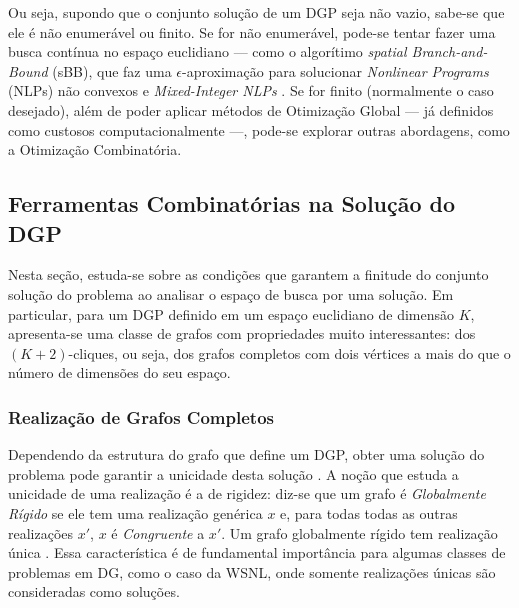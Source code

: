 Ou seja, supondo que o conjunto solução de um DGP seja não vazio, sabe-se que ele é não enumerável ou finito. Se for não enumerável, pode-se tentar fazer uma busca contínua no espaço euclidiano --- como o algorítimo \textit{spatial Branch-and-Bound} (sBB), que faz uma $\epsilon$-aproximação para solucionar \textit{Nonlinear Programs} (NLPs) não convexos e \textit{Mixed-Integer NLPs} \cite{carlileGDandAplications}. Se for finito (normalmente o caso desejado), além de poder aplicar métodos de Otimização Global --- já definidos como custosos computacionalmente ---, pode-se explorar outras abordagens, como a Otimização Combinatória.

\subsection{Ferramentas Combinatórias na Solução do DGP}

Nesta seção, estuda-se sobre as condições que garantem a finitude do conjunto solução do problema ao analisar o espaço de busca por uma solução. Em particular, para um DGP definido em um espaço euclidiano de dimensão $K$, apresenta-se uma classe de grafos com propriedades muito interessantes: dos $(K+2)$-cliques, ou seja, dos grafos completos com dois vértices a mais do que o número de dimensões do seu espaço.

\subsubsection{Realização de Grafos Completos}


Dependendo da estrutura do grafo que define um DGP, obter uma solução do problema pode garantir a unicidade desta solução \cite{eren2004rigidity}. A noção que estuda a unicidade de uma realização é a de rigidez: diz-se que um grafo é \textit{Globalmente Rígido} se ele tem uma realização genérica $x$ e, para todas todas as outras realizações $x'$, $x$ é \textit{Congruente} a $x'$. Um grafo globalmente rígido tem realização única \cite{rigidezGrafosEAplicacoesAnaCarlile}.
Essa característica é de fundamental importância para algumas classes de problemas em DG, como o caso da WSNL, onde somente realizações únicas são consideradas como soluções. 

